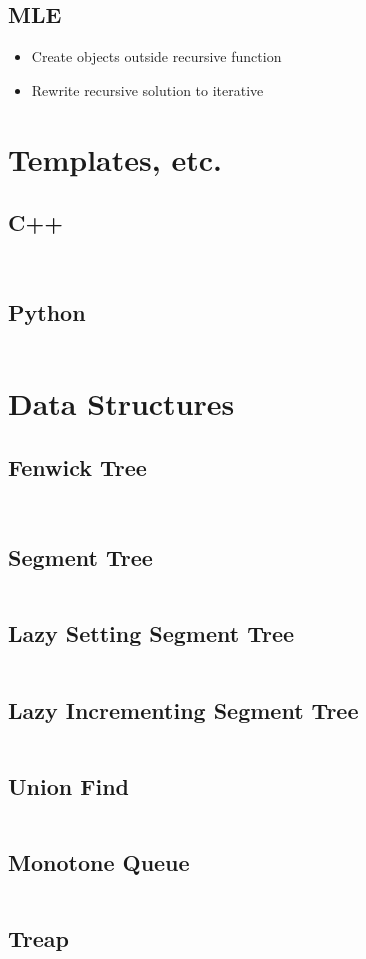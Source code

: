 \documentclass[8pt,a4paper,landscape,oneside]{amsart}
\newcommand{\codec}[1]{\inputminted[fontsize=\large,tabsize=2,baselinestretch=1]{cpp}{code/#1}}
\newcommand{\codep}[1]{\inputminted[fontsize=\large,tabsize=2,baselinestretch=1]{py}{code/#1}}
\begin{document}
\begin{multicols*}{2}
\begin{large}
\subsection{MLE}
\begin{itemize}
    \item Create objects outside recursive function
    \item Rewrite recursive solution to iterative
\end{itemize}
\section{Templates, etc.}
\subsection{C++}
\codec{template.cpp}
\codec{input.cpp}
\subsection{Python}
\codep{template.py}
\section{Data Structures}
\subsection{Fenwick Tree}
\codep{fenwicktree.py}
\codec{fenwicktree.cpp}
\subsection{Segment Tree}
\codep{sgmtree.cpp}
\subsection{Lazy Setting Segment Tree}
\codec{lazysetsgmtree.cpp}
\subsection{Lazy Incrementing Segment Tree}
\codec{lazyincsgmtree.cpp}
\subsection{Union Find}
\codep{unionfind.py}
\subsection{Monotone Queue}
\codep{monotonequeue.py}
\subsection{Treap}
\codec{Treap.cpp}

\end{large}
\end{multicols*}
\end{document}
